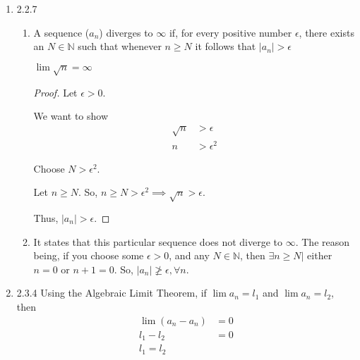 \documentclass[12pt,letterpaper]{article}
\begin{document}
\begin{enumerate}
\begin{enumerate}
\begin{proof}
            Let $n \ge N$.
            So, $n \ge N > 10 \implies \left \lfloor \frac{10 + n}{2n} \right \rfloor = 0 < \epsilon$.

            Thus, $|a_n - 0| < \epsilon$.
          \end{proof}
      \end{enumerate}

    \item 2.2.7
      \begin{enumerate}
        \item A sequence ($a_n$) diverges to $\infty$ if,
          for every positive number $\epsilon$,
          there exists an $N \in \mathbb{N}$ such that
          whenever $n \ge N$ it follows that $|a_n| > \epsilon$

          $\lim \sqrt{n} = \infty$

          \begin{proof}
            Let $\epsilon > 0$.

            We want to show
            \begin{align*}
              \sqrt{n} &> \epsilon \\
              n &> \epsilon^2
            \end{align*}

            Choose $N > \epsilon^2$.

            Let $n \ge N$.
            So, $n \ge N > \epsilon^2 \implies \sqrt{n} > \epsilon$.

            Thus, $|a_n| > \epsilon$.
          \end{proof}

        \item
          It states that this particular sequence does not diverge to $\infty$.
          The reason being,
          if you choose some $\epsilon > 0$, and any $N \in \mathbb{N}$,
          then $\exists n \ge N |$ either $n = 0$ or $n+1 = 0$.
          So, $|a_n| \not\ge \epsilon, \forall n$.
      \end{enumerate}

    \item 2.3.4
      Using the Algebraic Limit Theorem,
      if $\lim a_n = l_1$ and $\lim a_n = l_2$,
      then
      \begin{align*}
        \lim (a_n - a_n) &= 0 \\
        l_1 - l_2 &= 0 \\
        l_1 = l_2 \\
      \end{align*}


\end{enumerate}
\end{document}

